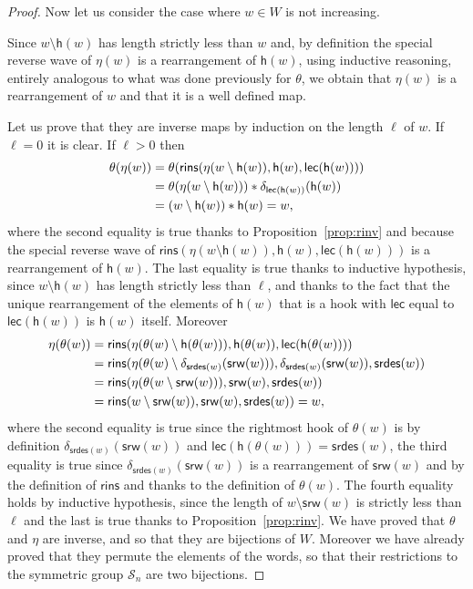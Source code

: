 \documentclass[a4paper]{amsart}
\newcommand{\lec}{\mathsf{lec}}
\newcommand{\srw}{\mathsf{srw}}
\newcommand{\rins}{\mathsf{rins}}
\newcommand{\h}{\mathsf{h}}
\newcommand{\srdes}{\mathsf{srdes}}
\theoremstyle{definition}
\theoremstyle{remark}
\numberwithin{equation}{section}
\begin{document}
\begin{proof}
Now let us consider the case where $w\in W$ is not increasing.

Since $w\setminus\h(w)$ has length strictly less than $w$ and, by definition the special reverse wave of $\eta(w)$ is a rearrangement of $\h(w)$, using inductive reasoning, entirely analogous to what was done previously for $\theta$, we obtain that $\eta(w)$ is a rearrangement of $w$ and that it is a well defined map. 

Let us prove that they are inverse maps by induction on the length $\ell$ of $w$. If $\ell=0$ it is clear. If $\ell>0$ then
\begin{align}
\theta(\eta(w))&=\theta(\rins(\eta(w\setminus\h(w)),\h(w),\lec(\h(w))))\notag\\
&=\theta(\eta(w\setminus\h(w)))*\delta_{\lec(\h(w))}(\h(w))\\
&=(w\setminus\h(w))*\h(w)=w,\notag
\end{align}
where the second equality is true thanks to Proposition~\ref{prop:rinv} and because the special reverse wave of $\rins(\eta(w\setminus\h(w)),\h(w),\lec(\h(w)))$ is a rearrangement of $\h(w)$. The last equality is true thanks to inductive hypothesis, since $w\setminus\h(w)$ has length strictly less than $\ell$, and thanks to the fact that the unique rearrangement of the elements of $\h(w)$ that is a hook with $\lec$ equal to $\lec(\h(w))$ is $\h(w)$ itself. Moreover
\begin{align}
    \eta(\theta(w))&=\rins(\eta(\theta(w)\setminus\h(\theta(w))),\h(\theta(w)),\lec(\h(\theta(w))))\notag\\
    &=\rins(\eta(\theta(w)\setminus\delta_{\srdes(w)}(\srw(w))),\delta_{\srdes(w)}(\srw(w)),\srdes(w))\\
    &=\rins(\eta(\theta(w\setminus\srw(w))),\srw(w),\srdes(w))\notag\\
    &=\rins(w\setminus\srw(w)),\srw(w),\srdes(w))=w\notag,
\end{align}
where the second equality is true since the rightmost hook of $\theta(w)$ is by definition $\delta_{\srdes(w)}(\srw(w))$ and $\lec(\h(\theta(w)))=\srdes(w)$, the third equality is true since $\delta_{\srdes(w)}(\srw(w))$ is a rearrangement of $\srw(w)$ and by the definition of $\rins$ and thanks to the definition of $\theta(w)$. The fourth equality holds by inductive hypothesis, since the length of $w\setminus\srw(w)$ is strictly less than $\ell$ and the last is true thanks to Proposition~\ref{prop:rinv}. We have proved that $\theta$ and $\eta$ are inverse, and so that they are bijections of $W$. Moreover we have already proved that they permute the elements of the words, so that their restrictions to the symmetric group $\mathcal{S}_n$ are two bijections.


\end{proof}
\end{document}

